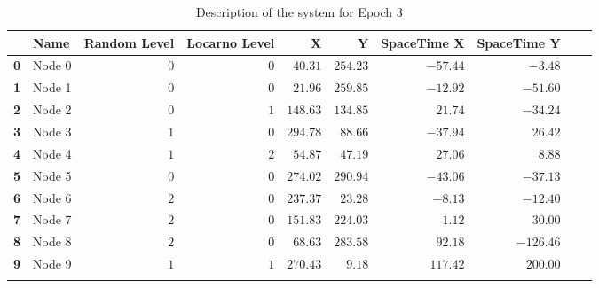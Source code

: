 \documentclass[a4paper,11pt,twoside=semi,openright]{report}
\begin{document}
\begin{table}[h]
\centering
\tiny
\begin{tabular}{@{}llrrrrrrll@{}}
\toprule
& \textbf{Name}   &\textbf{Random Level} &\textbf{Locarno Level} & \textbf{X} & \textbf{Y} & \textbf{SpaceTime X} & \textbf{SpaceTime Y}  \\ \midrule
\textbf{0} & Node 0&$0$&$0$&$40.31$&$254.23$&$-57.44$&$-3.48$&\\ \hdashline
\textbf{1} & Node 1&$0$&$0$&$21.96$&$259.85$&$-12.92$&$-51.60$&\\ \hdashline
\textbf{2} & Node 2&$0$&$1$&$148.63$&$134.85$&$21.74$&$-34.24$&\\ \hdashline
\textbf{3} & Node 3&$1$&$0$&$294.78$&$88.66$&$-37.94$&$26.42$&\\ \hdashline
\textbf{4} & Node 4&$1$&$2$&$54.87$&$47.19$&$27.06$&$8.88$&\\ \hdashline
\textbf{5} & Node 5&$0$&$0$&$274.02$&$290.94$&$-43.06$&$-37.13$&\\ \hdashline
\textbf{6} & Node 6&$2$&$0$&$237.37$&$23.28$&$-8.13$&$-12.40$&\\ \hdashline
\textbf{7} & Node 7&$2$&$0$&$151.83$&$224.03$&$1.12$&$30.00$&\\ \hdashline
\textbf{8} & Node 8&$2$&$0$&$68.63$&$283.58$&$92.18$&$-126.46$&\\ \hdashline
\textbf{9} & Node 9&$1$&$1$&$270.43$&$9.18$&$117.42$&$200.00$&\\ \hdashline\midrule
\bottomrule
\end{tabular}
\caption{Description of the system for Epoch 3}
\end{table}
\end{document}
